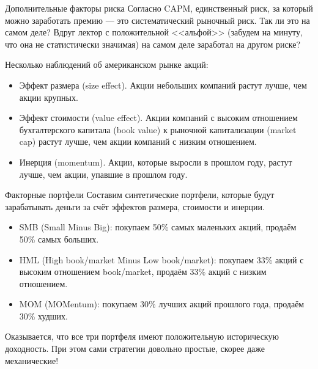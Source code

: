 \documentclass{beamer}
\begin{document}
\begin{frame}{Дополнительные факторы риска}
\justify
Согласно CAPM, единственный риск, за который можно заработать премию --- это систематический рыночный риск. Так ли это на самом деле? Вдруг лектор с положительной <<альфой>> (забудем на минуту, что она не статистически значимая) на самом деле заработал на другом риске?

\vspace{\baselineskip}
Несколько наблюдений об американском рынке акций:
\begin{itemize}
\justifying
\item Эффект размера (size effect). Акции небольших компаний растут лучше, чем акции крупных.
\item Эффект стоимости (value effect). Акции компаний с высоким отношением бухгалтерского капитала (book value) к рыночной капитализации (market cap) растут лучше, чем акции компаний с низким отношением.
\item Инерция (momentum). Акции, которые выросли в прошлом году, растут лучше, чем акции, упавшие в прошлом году.
\end{itemize}
\end{frame}



\begin{frame}{Факторные портфели}
\justify
Составим синтетические портфели, которые будут зарабатывать деньги за счёт эффектов размера, стоимости и инерции.

\begin{itemize}
\justifying
\item SMB (Small Minus Big): покупаем 50\% самых маленьких акций, продаём 50\% самых больших.
\item HML (High book/market Minus Low book/market): покупаем 33\% акций с высоким отношением book/market, продаём 33\% акций с низким отношением.
\item MOM (MOMentum): покупаем 30\% лучших акций прошлого года, продаём 30\% худших.
\end{itemize}
Оказывается, что все три портфеля имеют положительную историческую доходность. При этом сами стратегии довольно простые, скорее даже механические!
\end{frame}


    \newcommand{\addFactorPlot}[3]{
        \addplot[
            color=#2,
            mark=#3,
            line width=1pt,
            mark repeat=120,
            mark phase=36,
            mark options={scale=2}
        ]
        table [
            x = date,
            y = #1,
            col sep=comma
        ]
        {data/fama_french_cumulative_growth_data.csv};
    }
    
\end{document}
